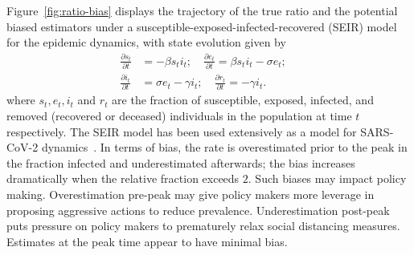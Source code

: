 \documentclass[11pt]{amsart}
\numberwithin{equation}{section}
\theoremstyle{plain}
\begin{document}
 Figure~\ref{fig:ratio-bias} displays the trajectory of the true ratio and the potential biased estimators under a susceptible-exposed-infected-recovered (SEIR) model~\citep{Pastor2001,Newman2002,Parshani2010} for the epidemic dynamics, with state evolution given by
 \begin{align}
 \frac{\partial s_t}{\partial t} &= - \beta s_t i_t; \quad \frac{\partial e_t}{\partial t} = \beta s_t i_t - \sigma e_t; \quad \label{eq:seir} \\
 \frac{\partial i_t}{\partial t} &= \sigma e_t - \gamma i_t; \quad
 \frac{\partial r_t}{\partial t} = - \gamma i_t. \nonumber
\end{align}
 where $s_t, e_t, i_t$ and $r_t$ are the fraction of susceptible, exposed, infected, and removed (recovered or deceased) individuals in the population at time $t$ respectively.  The SEIR model has been used extensively as a model for SARS-CoV-2 dynamics~\citep{Song2020}.  In terms of bias, the rate is overestimated prior to the peak in the fraction infected and underestimated afterwards; the bias increases dramatically when the relative fraction exceeds $2$.  Such biases may impact policy making.  Overestimation pre-peak may give policy makers more leverage in proposing aggressive actions to reduce prevalence.  Underestimation post-peak puts pressure on policy makers to prematurely relax social distancing measures.  Estimates at the peak time appear to have minimal bias.
\end{document}
